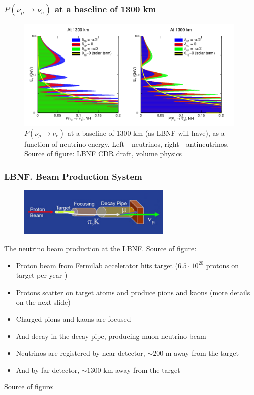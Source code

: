\begin{frame}\frametitle{$P(\nu_\mu \rightarrow \nu_e)$ at a baseline of 1300 km}
  \scriptsize
  \begin{figure}
  \label{fig:LBNF_oscProbability}
  \centering
  \includegraphics[width=0.98\textwidth, keepaspectratio=true]{figs/LBNF_oscProbability.png}
  \\$P(\nu_\mu \rightarrow \nu_e)$ at a baseline of 1300 km (as LBNF will have), as a function of neutrino energy. Left - neutrinos, right - antineutrinos. Source of figure: LBNF CDR draft, volume physics \cite{ref_LBNFdoc_volume-physics}
  \end{figure}
\end{frame}

\begin{frame}\frametitle{LBNF. Beam Production System}
\scriptsize
\begin{figure}
\label{fig:LBNF_nuBeam}
\centering
\includegraphics[width=0.65\textwidth, keepaspectratio=true]{figs/LBNF_nuBeam.png}  
\end{figure}
The neutrino beam production at the LBNF. Source of figure: \cite{ref_LBNFweb}\\
\begin{itemize}
  \item Proton beam from Fermilab accelerator hits target ($6.5\cdot10^{20}$ protons on target per year \cite{ref_LBNF_CDR_volumeBeam})
  \item Protons scatter on target atoms and produce pions and kaons {\tiny (more details on the next slide)}
  \item Charged pions and kaons are focused
  \item And decay in the decay pipe, producing muon neutrino beam
  \item Neutrinos are registered by near detector, $\sim 200$ m away from the target
  \item And by far detector, $\sim 1300$ km away from the target
\end{itemize}
Source of figure: \cite{ref_LBNFweb} 
\end{frame}

